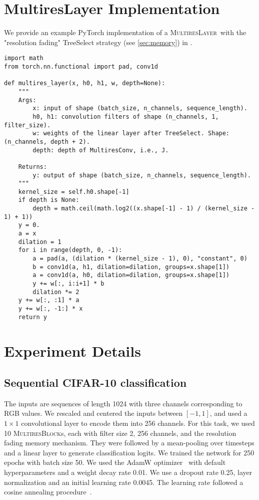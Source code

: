 \documentclass{article}
\theoremstyle{plain}
\theoremstyle{definition}
\theoremstyle{remark}
\newcommand{\ourlayer}{\textsc{MultiresLayer}}
\newcommand{\ourblock}{\textsc{MultiresBlock}}
\begin{document}
\section{MultiresLayer Implementation}
\label{app:torch-impl}

We provide an example PyTorch implementation of a \ourlayer\ with the "resolution fading" TreeSelect strategy (see \cref{sec:memory}) in .

\begin{figure*}[h]
\centering
\begin{verbatim}
import math
from torch.nn.functional import pad, conv1d    

def multires_layer(x, h0, h1, w, depth=None):
    """
    Args:
        x: input of shape (batch_size, n_channels, sequence_length).
        h0, h1: convolution filters of shape (n_channels, 1, filter_size).
        w: weights of the linear layer after TreeSelect. Shape: (n_channels, depth + 2).
        depth: depth of MultiresConv, i.e., J.
    
    Returns:
        y: output of shape (batch_size, n_channels, sequence_length).
    """
    kernel_size = self.h0.shape[-1]
    if depth is None:
        depth = math.ceil(math.log2((x.shape[-1] - 1) / (kernel_size - 1) + 1))
    y = 0.
    a = x
    dilation = 1
    for i in range(depth, 0, -1):
        a = pad(a, (dilation * (kernel_size - 1), 0), "constant", 0)
        b = conv1d(a, h1, dilation=dilation, groups=x.shape[1])
        a = conv1d(a, h0, dilation=dilation, groups=x.shape[1])
        y += w[:, i:i+1] * b
        dilation *= 2
    y += w[:, :1] * a 
    y += w[:, -1:] * x
    return y
\end{verbatim}
\caption{PyTorch code for implementing a \ourlayer\ with the "resolution fading" TreeSelect strategy. } \label{fig:torch-impl}
\end{figure*}


\section{Experiment Details}
\label{app:exp-details}

\subsection{Sequential CIFAR-10 classification}

The inputs are sequences of length 1024 with three channels corresponding to RGB values. 
We rescaled and centered the inputs between $[-1, 1]$, and used a $1\times 1$ convolutional layer to encode them into 256 channels.
For this task, we used 10 \ourblock s, 
each with filter size 2, 256 channels, and the resolution fading memory mechanism. 
They were followed by a mean-pooling over timesteps and a linear layer to generate classification logits. 
We trained the network for 250 epochs with batch size 50.
We used the AdamW optimizer~\citep{loshchilov2018decoupled} with default hyperparameters and a weight decay rate 0.01. 
We use a dropout rate 0.25, layer normalization and an initial learning rate 0.0045. 
The learning rate followed a cosine annealing procedure~\citep{loshchilov2017sgdr}. 
\end{document}

